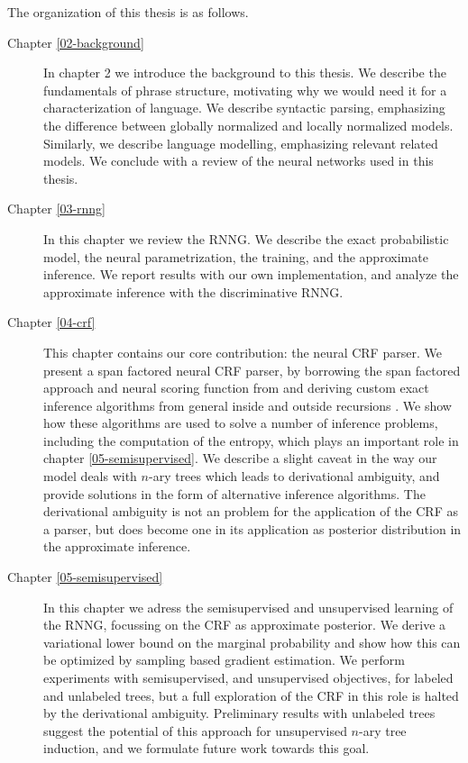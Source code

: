   The organization of this thesis is as follows.

  \begin{description}
    \item[Chapter \ref{02-background}]
      In chapter 2 we introduce the background to this thesis. We describe the fundamentals of phrase structure, motivating why we would need it for a characterization of language. We describe syntactic parsing, emphasizing the difference between globally normalized and locally normalized models. Similarly, we describe language modelling, emphasizing relevant related models. We conclude with a review of the neural networks used in this thesis.

    \item[Chapter \ref{03-rnng}]
      In this chapter we review the RNNG. We describe the exact probabilistic model, the neural parametrization, the training, and the approximate inference. We report results with our own implementation, and analyze the approximate inference with the discriminative RNNG.

    \item[Chapter \ref{04-crf}]
      This chapter contains our core contribution: the neural CRF parser. We present a span factored neural CRF parser, by borrowing the span factored approach and neural scoring function from \citet{stern2017minimal} and deriving custom exact inference algorithms from general inside and outside recursions \citep{goodman1999semiring}. We show how these algorithms are used to solve a number of inference problems, including the computation of the entropy, which plays an important role in chapter \ref{05-semisupervised}. We describe a slight caveat in the way our model deals with $n$-ary trees which leads to derivational ambiguity, and provide solutions in the form of alternative inference algorithms. The derivational ambiguity is not an problem for the application of the CRF as a parser, but does become one in its application as posterior distribution in the approximate inference.

    \item[Chapter \ref{05-semisupervised}]
      In this chapter we adress the semisupervised and unsupervised learning of the RNNG, focussing on the CRF as approximate posterior. We derive a variational lower bound on the marginal probability and show how this can be optimized by sampling based gradient estimation. We perform experiments with semisupervised, and unsupervised objectives, for labeled and unlabeled trees, but a full exploration of the CRF in this role is halted by the derivational ambiguity. Preliminary results with unlabeled trees suggest the potential of this approach for unsupervised $n$-ary tree induction, and we formulate future work towards this goal.



\end{description}
